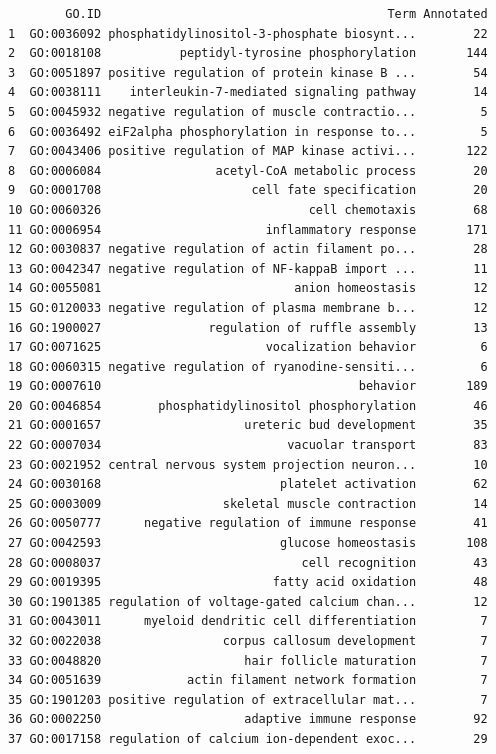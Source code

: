 \documentclass[]{article}
\begin{document}
\begin{verbatim}
        GO.ID                                        Term Annotated
1  GO:0036092 phosphatidylinositol-3-phosphate biosynt...        22
2  GO:0018108           peptidyl-tyrosine phosphorylation       144
3  GO:0051897 positive regulation of protein kinase B ...        54
4  GO:0038111    interleukin-7-mediated signaling pathway        14
5  GO:0045932 negative regulation of muscle contractio...         5
6  GO:0036492 eiF2alpha phosphorylation in response to...         5
7  GO:0043406 positive regulation of MAP kinase activi...       122
8  GO:0006084                acetyl-CoA metabolic process        20
9  GO:0001708                     cell fate specification        20
10 GO:0060326                             cell chemotaxis        68
11 GO:0006954                       inflammatory response       171
12 GO:0030837 negative regulation of actin filament po...        28
13 GO:0042347 negative regulation of NF-kappaB import ...        11
14 GO:0055081                           anion homeostasis        12
15 GO:0120033 negative regulation of plasma membrane b...        12
16 GO:1900027               regulation of ruffle assembly        13
17 GO:0071625                       vocalization behavior         6
18 GO:0060315 negative regulation of ryanodine-sensiti...         6
19 GO:0007610                                    behavior       189
20 GO:0046854        phosphatidylinositol phosphorylation        46
21 GO:0001657                    ureteric bud development        35
22 GO:0007034                          vacuolar transport        83
23 GO:0021952 central nervous system projection neuron...        10
24 GO:0030168                         platelet activation        62
25 GO:0003009                 skeletal muscle contraction        14
26 GO:0050777      negative regulation of immune response        41
27 GO:0042593                         glucose homeostasis       108
28 GO:0008037                            cell recognition        43
29 GO:0019395                        fatty acid oxidation        48
30 GO:1901385 regulation of voltage-gated calcium chan...        12
31 GO:0043011      myeloid dendritic cell differentiation         7
32 GO:0022038                 corpus callosum development         7
33 GO:0048820                    hair follicle maturation         7
34 GO:0051639            actin filament network formation         7
35 GO:1901203 positive regulation of extracellular mat...         7
36 GO:0002250                    adaptive immune response        92
37 GO:0017158 regulation of calcium ion-dependent exoc...        29

\end{verbatim}
\end{document}
